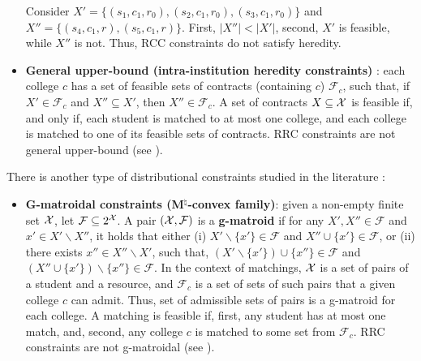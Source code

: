 \begin{itemize}
\begin{example}
         Consider $X'=\{(s_1,c_1,r_0),(s_2,c_1,r_0),(s_3,c_1,r_0)\}$ and $X''=\{(s_4,c_1,r),(s_5,c_1,r)\}$. First, $|X''|<|X'|$, second, $X'$ is feasible, while $X''$ is not. Thus, RCC constraints do not satisfy heredity.
    \end{example}


    \item \textbf{General upper-bound (intra-institution heredity constraints)} \citep{kamada24}: each college $c$ has a set of feasible sets of contracts (containing $c$) $\mathcal{F}_c$, such that, if $X'\in \mathcal{F}_c$ and $X''\subseteq X'$, then $X''\in \mathcal{F}_c$. A set of contracts $X\subseteq \operatorname{{\color{black}\mathcal{X}}}$ is feasible if, and only if, each student is matched to at most one college, and each college is matched to one of its feasible sets of contracts. RRC constraints are not general upper-bound (see ).
    
\end{itemize}

There is another type of distributional constraints studied in the literature \cite{imamura24a}:

\begin{itemize}
    \item \textbf{G-matroidal constraints (M$^\natural$-convex family)}: given a non-empty finite set $\operatorname{{\color{black}\mathcal{X}}}$, let $\mathcal{F}\subseteq 2^{\operatorname{{\color{black}\mathcal{X}}}}$. A pair $(\operatorname{{\color{black}\mathcal{X}}},\mathcal{F})$ is a \textbf{g-matroid} if for any $X',X''\in \mathcal{F}$ and $x'\in X'\backslash X''$, it holds that either (i) $X'\backslash\{x'\}\in \mathcal{F}$ and $X''\cup\{x'\}\in \mathcal{F}$, or (ii) there exists $x''\in X''\backslash X'$, such that, $(X'\backslash \{x'\})\cup\{x''\}\in \mathcal{F}$ and $(X''\cup\{x'\})\backslash\{x''\}\in \mathcal{F}$. In the context of matchings, $\operatorname{{\color{black}\mathcal{X}}}$ is a set of pairs of a student and a resource, and $\mathcal{F}_c$ is a set of sets of such pairs that a given college $c$ can admit. Thus, set of admissible sets of pairs is a g-matroid for each college. A matching is feasible if, first, any student has at most one match, and, second, any college $c$ is matched to some set from $\mathcal{F}_c$. RRC constraints are not g-matroidal (see ).
\end{itemize}

